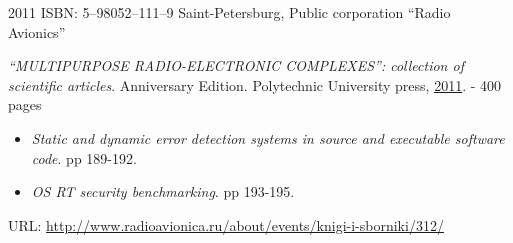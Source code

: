 

\begin{entrylist}
    \entry
    {2011}
    {ISBN: 5–98052–111–9}
    {Saint-Petersburg, Public corporation \enquote{Radio Avionics}}
    {\textit{\enquote{MULTIPURPOSE RADIO-ELECTRONIC COMPLEXES}: collection of scientific articles}. Anniversary Edition. Polytechnic University press, \underline{2011}. - 400 pages
    \begin{itemize}
        \item \textit{Static and dynamic error detection systems in source and executable software code}. pp 189-192.
        \item \textit{OS RT security benchmarking}. pp 193-195.
    \end{itemize}
    URL: \url{http://www.radioavionica.ru/about/events/knigi-i-sborniki/312/}
    }
\end{entrylist}
